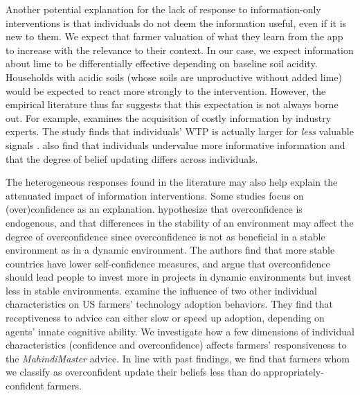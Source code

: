 \documentclass[12pt,letterpaper]{article}
\begin{document}
Another potential explanation for the lack of response to information-only interventions is that individuals do not deem the information useful, even if it is new to them. We expect that farmer valuation of what they learn from the app to increase with the relevance to their context. In our case, we expect information about lime to be differentially effective depending on baseline soil acidity. Households with acidic soils (whose soils are unproductive without added lime) would be expected to react more strongly to the intervention. However, the empirical literature thus far suggests that this expectation is not always borne out. For example, \citet{hoffman_how_2016} examines the acquisition of costly information by industry experts. The study finds that individuals' WTP is actually larger for \textit{less} valuable signals \citep{hoffman_how_2016, ambuehl_belief_2018}. \citet{ambuehl_belief_2018} also find that individuals undervalue more informative information and that the degree of belief updating differs across individuals.


The heterogeneous responses found in the literature may also help explain the attenuated impact of information interventions. Some studies focus on (over)confidence as an explanation. \citet{dessi_overconfidence_2018} hypothesize that overconfidence is endogenous, and that differences in the stability of an environment may affect the degree of overconfidence since overconfidence is not as beneficial in a stable environment as in a dynamic environment. The authors find that more stable countries have lower self-confidence measures, and argue that overconfidence should lead people to invest more in projects in dynamic environments but invest less in stable environments. \cite{barham_receptiveness_2018} examine the influence of two other individual characteristics on US farmers' technology adoption behaviors. They find that receptiveness to advice can either slow or speed up adoption, depending on agents' innate cognitive ability. We investigate how a few dimensions of individual characteristics (confidence and overconfidence) affects farmers' responsiveness to the \textit{MahindiMaster} advice. In line with past findings, we find that farmers whom we classify as overconfident update their beliefs less than do appropriately-confident farmers.
\end{document}
